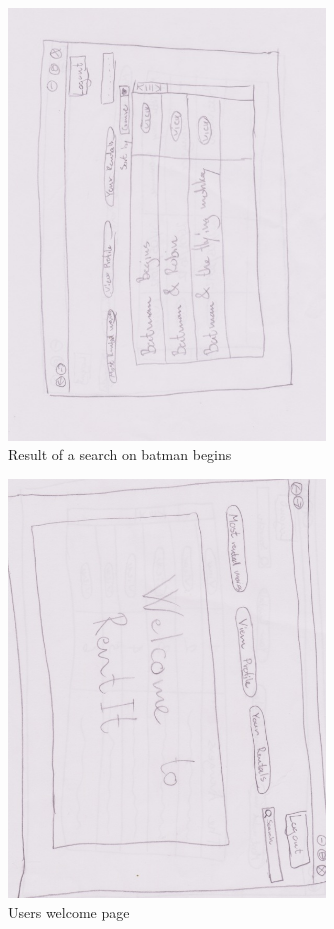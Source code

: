 \clearpage

\begin{figure}[!ht]
  \centering
    \includegraphics[width=0.75\textwidth]{Parts/Appendix/Images/PaperMockup/Search}
  \caption{Result of a search on batman begins}
  \label{fig:Appendix_GUI_sketches_Search}
\end{figure}

\begin{figure}[!ht]
  \centering
    \includegraphics[width=0.75\textwidth]{Parts/Appendix/Images/PaperMockup/UserWelcome}
  \caption{Users welcome page}
  \label{fig:Appendix_GUI_sketches_UserWelcome}
\end{figure}



